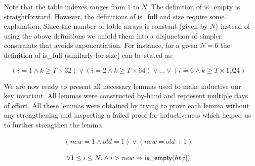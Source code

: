 \noindent Note that the table indexes ranges from $1$ to $N$. The
definition of \textsf{is\_empty} is straightforward. However, the
definitions of \textsf{is\_full} and \textsf{size} require some
explanation. Since the number of table arrays is constant (given by
$N$) instead of using the above definitions we unfold them into a
disjunction of simpler constraints that avoids exponentiation. For
instance, for a given $N=6$ the definition of \textsf{is\_full}
(similarly for \textsf{size}) can be stated as:

\[ (i=1 \wedge k \geq T \times 32) \vee (i=2 \wedge k \geq T \times 64) \vee \ldots \vee (i=6 \wedge k \geq T \times 1024) \]

We are now ready to present all necessary lemmas used to make
inductive our key invariant. All lemmas were constructed by-hand and
represent multiple days of effort. All these lemmas were obtained by
trying to prove each lemma without any strengthening and inspecting a
failed proof for inductiveness which helped us to further strengthen
the lemma.


\begin{lemma}
  \begin{equation*}
    \begin{array}{l}      
      (new = 1 \wedge old = 1) \vee (new = old+1)
    \end{array}
  \end{equation*}
  \label{old_and_new}
\end{lemma}

\begin{lemma}
  \begin{equation*}
\begin{array}{l}      
  \forall 1 \leq i \leq N.  \wedge i > new \Rightarrow \mathsf{is\_empty}(\mbox{$ht[i]$})
\end{array}
\end{equation*}  
\label{empty_beyond_new}  
\end{lemma}  

